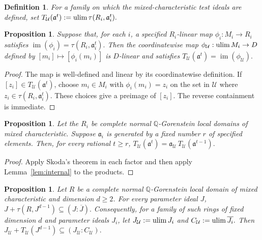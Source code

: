 \documentclass[11pt,a4paper]{amsart}
\numberwithin{equation}{section}
\newtheorem{proposition}[theorem]{Proposition}
\newtheorem{definition}[theorem]{Definition}
\newcommand{\U}{\mathcal{U}}
\newcommand{\ideal}{\mathfrak a}
\newcommand{\cl}[1]{\overline{#1}}
\begin{document}
 \begin{definition}
 	For a family on which the mixed-characteristic test ideals are
 	defined, set
$T_{\U}(\ideal^t):=\ulim\tau(R_i,\ideal_i^t).$
 
 \end{definition}
 
 \begin{proposition}
 	\label{prop:trace}
 	Suppose that, for each $i$, a specified $R_i$-linear map
 	$ 	\phi_i:M_i\to R_i$
  satisfies 
$\operatorname{im}(\phi_i)=\tau(R_i,\ideal_i^t). $
 	Then the coordinatewise map
 $\phi_{\U}:\ulim M_i\to D$ defined  by 
 $[m_i]\mapsto[\phi_i(m_i)]$
 	is $D$-linear and satisfies
$T_{\U}(\ideal^t)=\operatorname{im}(\phi_{\U}). $
 \end{proposition}
 
 \begin{proof}
 	The map is well-defined and linear by its coordinatewise
 	definition. If $[z_i]\in T_{\U}(\ideal^t)$, choose
 	$m_i\in M_i$ with $\phi_i(m_i)=z_i$ on the set in $\U$
 	where $z_i\in\tau(R_i,\ideal_i^t)$. These choices give a preimage
 	of $[z_i]$. The reverse containment is immediate.
 \end{proof}
 

 
 \begin{proposition}\label{prop:skoda}
 	Let the $R_i$ be complete  normal $\mathbb Q$-Gorenstein
 	local domains of mixed characteristic. Suppose $\ideal_i$ is
 	generated by a fixed number $r$ of specified elements. Then, for
 	every rational $t\geq r$,
 	$T_{\U}(\ideal^t)=\ideal_{\U}\,T_{\U}(\ideal^{t-1}).$
 \end{proposition}
 
 \begin{proof}
 	Apply Skoda's theorem in each factor
 	\cite[Theorem 8.7 and Corollary 8.20(b)]{BMP} and then apply
 	Lemma~\ref{lem:internal} to the products. 
 \end{proof}
 
 \begin{proposition}\label{prop:one-sided}
 	Let $R$ be a complete  normal $\mathbb Q$-Gorenstein
 	local domain of mixed characteristic and dimension $d\geq2$.
 	For every parameter ideal $J$,  
 	$J+\tau(R,J^{d-1})\subseteq( J:\cl J).$
 	Consequently, for a family of such rings of fixed dimension $d$
 	and parameter ideals $J_i$, let
 	$ J_{\U}:=\ulim J_i$ and $ C_{\U}:=\ulim\cl{J_i}.$
 	Then
$J_{\U}+T_{\U}(J^{d-1})
 	\subseteq (J_{\U}:C_{\U}).$
 \end{proposition}
 
\end{document}
